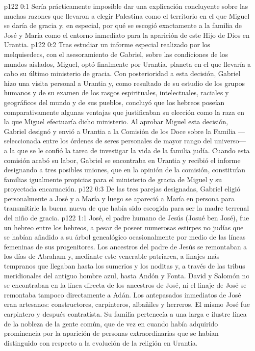 \author{Comisión de seres intermedios}
\vs p122 0:1 Sería prácticamente imposible dar una explicación concluyente sobre las muchas razones que llevaron a elegir Palestina como el territorio en el que Miguel se daría de gracia y, en especial, por qué se escogió exactamente a la familia de José y María como el entorno inmediato para la aparición de este Hijo de Dios en Urantia.
\vs p122 0:2 Tras estudiar un informe especial realizado por los melquisedecs, con el asesoramiento de Gabriel, sobre las condiciones de los mundos aislados, Miguel, optó finalmente por Urantia, planeta en el que llevaría a cabo su último ministerio de gracia. Con posterioridad a esta decisión, Gabriel hizo una visita personal a Urantia y, como resultado de su estudio de los grupos humanos y de su examen de los rasgos espirituales, intelectuales, raciales y geográficos del mundo y de sus pueblos, concluyó que los hebreos poseían comparativamente algunas ventajas que justificaban su elección como la raza en la que Miguel efectuaría dicho ministerio. Al aprobar Miguel esta decisión, Gabriel designó y envió a Urantia a la Comisión de los Doce sobre la Familia ---seleccionada entre los órdenes de seres personales de mayor rango del universo--- a la que se le confió la tarea de investigar la vida de la familia judía. Cuando esta comisión acabó su labor, Gabriel se encontraba en Urantia y recibió el informe designando a tres posibles uniones, que en la opinión de la comisión, constituían familias igualmente propicias para el ministerio de gracia de Miguel y su proyectada encarnación.
\vs p122 0:3 De las tres parejas designadas, Gabriel eligió personalmente a José y a María y luego se apareció a María en persona para transmitirle la buena nueva de que había sido escogida para ser la madre terrenal del niño de gracia.
\vs p122 1:1 José, el padre humano de Jesús (Josué ben José), fue un hebreo entre los hebreos, a pesar de poseer numerosas estirpes no judías que se habían añadido a su árbol genealógico ocasionalmente por medio de las líneas femeninas de sus progenitores. Los ancestros del padre de Jesús se remontaban a los días de Abraham y, mediante este venerable patriarca, a linajes más tempranos que llegaban hasta los sumerios y los noditas y, a través de las tribus meridionales del antiguo hombre azul, hasta Andón y Fonta. David y Salomón no se encontraban en la línea directa de los ancestros de José, ni el linaje de José se remontaba tampoco directamente a Adán. Los antepasados inmediatos de José eran artesanos: constructores, carpinteros, albañiles y herreros. El mismo José fue carpintero y después contratista. Su familia pertenecía a una larga e ilustre línea de la nobleza de la gente común, que de vez en cuando había adquirido prominencia por la aparición de personas extraordinarias que se habían distinguido con respecto a la evolución de la religión en Urantia.
